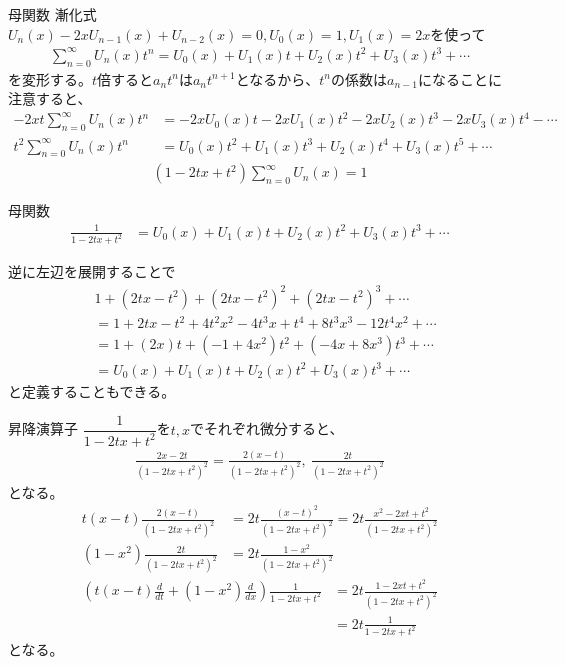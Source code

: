 \documentclass[dvipdfmx]{beamer}
\begin{document}
\begin{frame}{母関数}
漸化式$U_{n}(x)-2xU_{n-1}(x)+U_{n-2}(x)=0, U_0(x)=1, U_1(x)=2x$を使って
\begin{align*}
\sum^\infty_{n=0}U_n(x)t^n=U_0(x)+U_1(x)t+U_2(x)t^2+U_3(x)t^3+\cdots
\end{align*}
を変形する。$t$倍すると$a_nt^n$は$a_nt^{n+1}$となるから、$t^n$の係数は$a_{n-1}$になることに注意すると、
\begin{align*}
-2xt\sum^\infty_{n=0}U_n(x)t^n&=-2xU_0(x)t-2xU_1(x)t^2-2xU_2(x)t^3-2xU_3(x)t^4-\cdots\\
t^2\sum^\infty_{n=0}U_n(x)t^n&=U_0(x)t^2+U_1(x)t^3+U_2(x)t^4+U_3(x)t^5+\cdots
\end{align*}
\begin{align*}
(1-2tx+t^2)\sum^\infty_{n=0}U_n(x)=1
\end{align*}
\end{frame}

\begin{frame}{母関数}
\begin{align*}
\frac{1}{1-2tx+t^2}&=U_0(x)+U_1(x)t+U_2(x)t^2+U_3(x)t^3+\cdots
\end{align*}

逆に左辺を展開することで
\begin{align*}
&1+(2tx-t^2)+(2tx-t^2)^2+(2tx-t^2)^3+\cdots\\
&=1+2tx-t^2+4t^2x^2-4t^3x+t^4+8t^3x^3-12t^4x^2+\cdots\\
&=1+(2x)t+(-1+4x^2)t^2+(-4x+8x^3)t^3+\cdots\\
&=U_0(x)+U_1(x)t+U_2(x)t^2+U_3(x)t^3+\cdots
\end{align*}
と定義することもできる。
\end{frame}


\begin{frame}{昇降演算子}
$\dfrac{1}{1-2tx+t^2}$を$t, x$でそれぞれ微分すると、
\begin{align*}
\frac{2x-2t}{(1-2tx+t^2)^2}=\frac{2(x-t)}{(1-2tx+t^2)^2},~\frac{2t}{(1-2tx+t^2)^2}
\end{align*}
となる。
\begin{align*}
t(x-t)\frac{2(x-t)}{(1-2tx+t^2)^2}&=2t\frac{(x-t)^2}{(1-2tx+t^2)^2}=2t\frac{x^2-2xt+t^2}{(1-2tx+t^2)^2}\\
(1-x^2)\frac{2t}{(1-2tx+t^2)^2}&=2t\frac{1-x^2}{(1-2tx+t^2)^2}
\end{align*}
\begin{align*}
(t(x-t)\frac{d}{dt}+(1-x^2)\frac{d}{dx})\frac{1}{1-2tx+t^2}&=2t\frac{1-2xt+t^2}{(1-2tx+t^2)^2}\\
&=2t\frac{1}{1-2tx+t^2}
\end{align*}
となる。
\end{frame}
\end{document}
